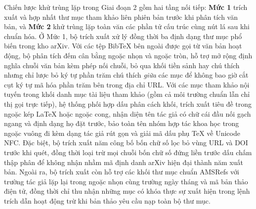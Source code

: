 Chiến lược khử trùng lặp trong Giai đoạn 2 gồm hai tầng nối tiếp: \textbf{Mức 1} trích xuất và hợp nhất thư mục tham khảo liên phiên bản trước khi phân tích văn bản, và \textbf{Mức 2} khử trùng lặp toàn văn các phần tử cấu trúc cùng nút lá sau khi chuẩn hóa. Ở Mức 1, bộ trích xuất xử lý đồng thời ba định dạng thư mục phổ biến trong kho arXiv. Với các tệp BibTeX bên ngoài được gọi từ văn bản hoạt động, bộ phân tích đếm cân bằng ngoặc nhọn và ngoặc tròn, hỗ trợ mở rộng định nghĩa chuỗi văn bản kèm phép nối chuỗi, bỏ qua khối tiền sảnh hay chú thích nhưng chỉ lược bỏ ký tự phần trăm chú thích \emph{giữa} các mục để không bao giờ cắt cụt ký tự mã hóa phần trăm bên trong địa chỉ URL. Với các mục tham khảo nội tuyến trong khối danh mục tài liệu tham khảo (gồm cả môi trường chuẩn lẫn chỉ thị gọi trực tiếp), hệ thống phối hợp dấu phân cách khối, trích xuất tiêu đề trong ngoặc kép LaTeX hoặc ngoặc cong, nhận diện tên tác giả có chữ cái đầu nối gạch ngang và định dạng họ đặt trước, bảo toàn tên nhóm hợp tác khoa học trong ngoặc vuông đi kèm dạng tác giả rút gọn và giải mã dấu phụ TeX về Unicode NFC. Đặc biệt, bộ trích xuất năm công bố bốn chữ số lọc bỏ vùng URL và DOI trước khi quét, đồng thời loại trừ mọi chuỗi bốn chữ số đứng liền trước dấu chấm thập phân để không nhận nhầm mã định danh arXiv hiện đại thành năm xuất bản. Ngoài ra, bộ trích xuất còn hỗ trợ các khối thư mục chuẩn AMSRefs với trường tác giả lặp lại trong ngoặc nhọn cùng trường ngày tháng và mã bản thảo điện tử, đồng thời chỉ thu nhận những mục có khóa thực sự xuất hiện trong lệnh trích dẫn hoạt động trừ khi bản thảo yêu cầu nạp toàn bộ thư mục.

